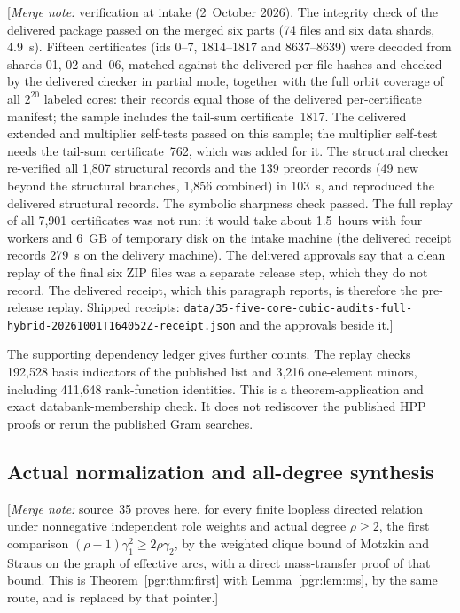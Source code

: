 \documentclass[11pt]{article}
\numberwithin{equation}{section}
\theoremstyle{definition}\newtheorem{definition}[theorem]{Definition}\newtheorem{remark}[theorem]{Remark}
\newcommand{\mnote}[1]{[\textit{Merge note:} #1]}
\begin{document}
\mnote{verification at intake (2~October 2026). The integrity check of
the delivered package passed on the merged six parts (74 files and six
data shards, 4.9~s). Fifteen certificates (ids 0--7, 1814--1817 and
8637--8639) were decoded from shards 01, 02 and~06, matched against the
delivered per-file hashes and checked by the delivered checker in partial
mode, together with the full orbit coverage of all $2^{20}$ labeled
cores: their records equal those of the delivered per-certificate
manifest; the sample includes the tail-sum certificate~1817. The
delivered extended and multiplier self-tests passed on this sample; the
multiplier self-test needs the tail-sum certificate~762, which was added
for it. The structural checker re-verified all 1,807 structural records and the 139
preorder records (49 new beyond the structural branches, 1,856 combined)
in 103~s, and reproduced the delivered structural records. The symbolic
sharpness check passed. The full replay of all 7,901 certificates was not
run: it would take about 1.5~hours with four workers and 6~GB of
temporary disk on the intake machine (the delivered receipt records
279~s on the delivery machine). The delivered approvals say that a clean
replay of the final six ZIP files was a separate release step, which they
do not record. The delivered receipt, which this paragraph reports, is
therefore the pre-release replay. Shipped receipts:
\nolinkurl{data/35-five-core-cubic-audits-full-hybrid-20261001T164052Z-receipt.json}
and the approvals beside it.}

The supporting dependency ledger gives further counts. The replay checks
192,528 basis indicators of the published list and 3,216 one-element
minors, including 411,648 rank-function identities. This is a
theorem-application and exact databank-membership check. It does not
rediscover the published HPP proofs or rerun the published Gram searches.

\subsection{Actual normalization and all-degree synthesis}

\mnote{source~35 proves here, for every finite loopless directed relation
under nonnegative independent role weights and actual degree $\rho\ge2$,
the first comparison $(\rho-1)\gamma_1^2\ge2\rho\gamma_2$, by the weighted
clique bound of Motzkin and Straus \cite{MS} on the graph of effective
arcs, with a direct mass-transfer proof of that bound. This is
Theorem~\ref{pgr:thm:first} with Lemma~\ref{pgr:lem:ms}, by the same route,
and is replaced by that pointer.}
\end{document}
